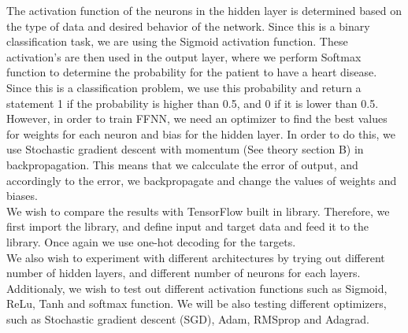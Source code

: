 \documentclass[reprint,english,notitlepage]{revtex4-1}  %
\begin{document}
The activation function of the neurons in the hidden layer is determined based on the type of data and desired behavior of the network. Since this is a binary classification task, we are using the Sigmoid \cite{proj2} activation function. These activation's are then used in the output layer, where we perform Softmax function \cite{proj2} to determine the probability for the patient to have a heart disease. Since this is a classification problem, we use this probability and return a statement 1 if the probability is higher than 0.5, and 0 if it is lower than 0.5.
\vspace{3mm}
\\
However, in order to train FFNN, we need an optimizer to find the best values for weights for each neuron and bias for the hidden layer. In order to do this, we use Stochastic gradient descent with momentum (See \cite{proj2} theory section B) in backpropagation. This means that we calcculate the error of output, and accordingly to the error, we backpropagate and change the values of weights and biases.
\vspace{3mm}
\\
We wish to compare the results with TensorFlow built in library. Therefore, we first import the library, and define input and target data and feed it to the library. Once again we use one-hot decoding for the targets. 
\vspace{3mm}
\\
We also wish to experiment with different architectures by trying out different number of hidden layers, and different number of neurons for each layers. Additionaly, we wish to test out different activation functions such as Sigmoid, ReLu, Tanh and softmax function. We will be also testing different optimizers, such as Stochastic gradient descent (SGD), Adam, RMSprop and Adagrad. 
\end{document}
